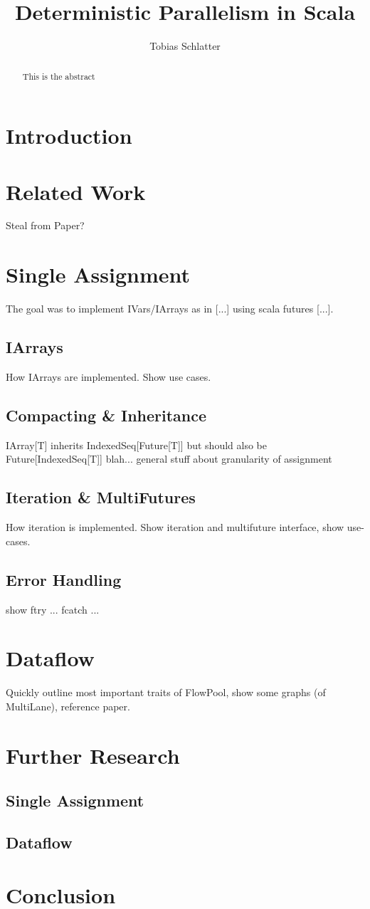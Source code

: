 \documentclass[fleqn]{scrartcl}
\title{Deterministic Parallelism in Scala}
\author{Tobias Schlatter}
\begin{document}
\maketitle

\begin{abstract}
  This is the abstract
\end{abstract}

\tableofcontents

\section{Introduction}

\section{Related Work}
Steal from Paper?

\section{Single Assignment}
The goal was to implement IVars/IArrays as in [...] using scala
futures [...].

\subsection{IArrays}
How IArrays are implemented. Show use cases.

\subsection{Compacting \& Inheritance}
IArray[T] inherits IndexedSeq[Future[T]] but should also be
Future[IndexedSeq[T]] blah... general stuff about granularity of
assignment

\subsection{Iteration \& MultiFutures}
How iteration is implemented. Show iteration and multifuture
interface, show use-cases.

\subsection{Error Handling}
show ftry { ... } fcatch { ... }

\section{Dataflow}
Quickly outline most important traits of FlowPool, show some graphs
(of MultiLane), reference paper.

\section{Further Research}
\subsection{Single Assignment}
\subsection{Dataflow}

\section{Conclusion}
\end{document}
